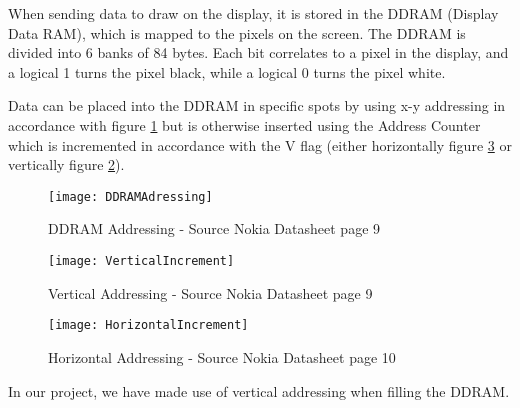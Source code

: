 When sending data to draw on the display, it is stored in the DDRAM (Display Data RAM), which is mapped to the pixels on the screen. The DDRAM is divided into 6 banks of 84 bytes. Each bit correlates to a pixel in the display, and a logical 1 turns the pixel black, while a logical 0 turns the pixel white.

Data can be placed into the DDRAM in specific spots by using x-y addressing in accordance with figure \ref{DDRAMAdressing} but is otherwise inserted using the Address Counter which is incremented in accordance with the V flag (either horizontally figure \ref{HorizontalIncrement} or vertically figure \ref{VerticalIncrement}).

\begin{figure}[H]
	\texttt{[image: DDRAMAdressing]}
	\centering
	\caption{DDRAM Addressing - Source Nokia Datasheet\cite{NokiaDisplay} page 9}
	\label{DDRAMAdressing}
\end{figure}

\begin{figure}[H]
	\texttt{[image: VerticalIncrement]}
	\centering
	\caption{Vertical Addressing - Source Nokia Datasheet\cite{NokiaDisplay} page 9}
	\label{VerticalIncrement}
\end{figure}

\begin{figure}[H]
	\texttt{[image: HorizontalIncrement]}
	\centering
	\caption{Horizontal Addressing - Source Nokia Datasheet\cite{NokiaDisplay} page 10}
	\label{HorizontalIncrement}
\end{figure}

In our project, we have made use of vertical addressing when filling the DDRAM.